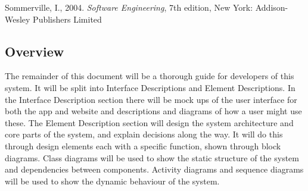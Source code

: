 Sommerville, I., 2004. \emph{Software Engineering}, 7th edition, New York: Addison-Wesley Publishers Limited

\subsection{Overview}

The remainder of this document will be a thorough guide for developers of this system. It will be split into Interface Descriptions and Element Descriptions. In the Interface Description section there will be mock ups of the user interface for both the app and website and descriptions and diagrams of how a user might use these. The Element Description section will design the system architecture and core parts of the system, and explain decisions along the way. It will do this through design elements each with a specific function, shown through block diagrams. Class diagrams will be used to show the static structure of the system and dependencies between components. Activity diagrams and sequence diagrams will be used to show the dynamic behaviour of the system.



